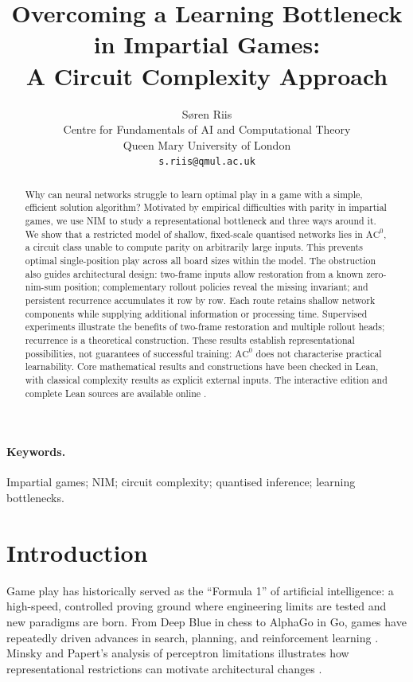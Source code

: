 \documentclass[11pt]{article}
\title{Overcoming a Learning Bottleneck in Impartial Games:\\
A Circuit Complexity Approach}
\author{S{\o}ren Riis\\
Centre for Fundamentals of AI and Computational Theory\\
Queen Mary University of London\\
\texttt{s.riis@qmul.ac.uk}}
\date{}
\newcommand{\AC}{\mathrm{AC}}
\theoremstyle{plain}
\theoremstyle{definition}
\theoremstyle{remark}
\numberwithin{equation}{section}
\begin{document}
\maketitle

\begin{abstract}
Why can neural networks struggle to learn optimal play in a game with a simple, efficient solution algorithm? Motivated by empirical difficulties with parity in impartial games, we use NIM to study a representational bottleneck and three ways around it. We show that a restricted model of shallow, fixed-scale quantised networks lies in $\AC^0$, a circuit class unable to compute parity on arbitrarily large inputs. This prevents optimal single-position play across all board sizes within the model.
The obstruction also guides architectural design: two-frame inputs allow restoration from a known zero-nim-sum position; complementary rollout policies reveal the missing invariant; and persistent recurrence accumulates it row by row. Each route retains shallow network components while supplying additional information or processing time. Supervised experiments illustrate the benefits of two-frame restoration and multiple rollout heads; recurrence is a theoretical construction. These results establish representational possibilities, not guarantees of successful training: $\AC^0$ does not characterise practical learnability.
Core mathematical results and constructions have been checked in Lean, with classical complexity results as explicit external inputs. The interactive edition and complete Lean sources are available online \cite{riis2026interactive,riis2026lean}.
\end{abstract}

\paragraph{Keywords.}
Impartial games; NIM; circuit complexity; quantised inference; learning bottlenecks.



\section{Introduction}
\label{sec:intro}

Game play has historically served as the ``Formula 1'' of artificial intelligence: a high-speed, controlled proving ground where engineering limits are tested and new paradigms are born.
From Deep Blue in chess to AlphaGo in Go, games have repeatedly driven advances in search, planning, and reinforcement learning \cite{silver2016alphago,silver2017alphagozero,silver2018alphazero,schrittwieser2020muzero}.
Minsky and Papert's analysis of perceptron limitations illustrates how representational restrictions can motivate architectural changes \cite{minsky1969perceptrons}.
\end{document}
